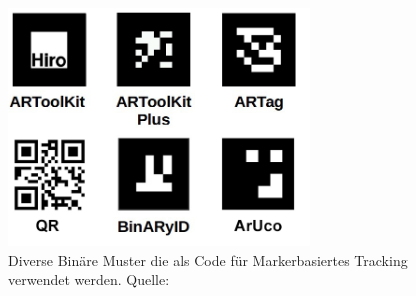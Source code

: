 \begin{figure}[H] 
	\center 
	\includegraphics[width=8cm]{Bilder/BinMuster.jpg}			
	\caption{Diverse Binäre Muster die als Code für Markerbasiertes Tracking verwendet werden. Quelle: \cite{article:Aruco2014}}
	\label{fig:BinMarker}
\end{figure}

\newpage